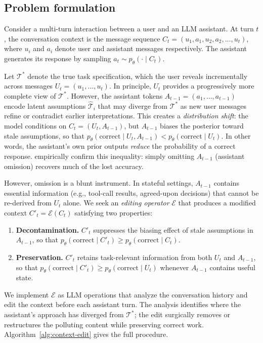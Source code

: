 \documentclass{article}
\begin{document}
\subsection{Problem formulation}
\label{sec:problem-setting}

Consider a multi-turn interaction between a user and an LLM assistant. At turn $t$, the conversation context is the message sequence $C_t = (u_1, a_1, u_2, a_2, \ldots, u_t)$, where $u_i$ and $a_i$ denote user and assistant messages respectively. The assistant generates its response by sampling $a_t \sim p_\theta(\cdot \mid C_t)$.

Let $\mathcal{T}^*$ denote the true task specification, which the user reveals incrementally across messages $U_t = (u_1, \ldots, u_t)$.  In principle, $U_t$ provides a progressively more complete view of $\mathcal{T}^*$.  However, the assistant tokens $A_{t-1} = (a_1, \ldots, a_{t-1})$ encode latent assumptions $\hat{\mathcal{T}}_i$ that may diverge from $\mathcal{T}^*$ as new user messages refine or contradict earlier interpretations.  This creates a \emph{distribution shift}: the model conditions on $C_t = (U_t, A_{t-1})$, but $A_{t-1}$ biases the posterior toward stale assumptions, so that $p_\theta(\text{correct} \mid U_t, A_{t-1}) < p_\theta(\text{correct} \mid U_t)$. In other words, the assistant's own prior outputs \emph{reduce} the probability of a correct response. \citet{huang2026context} empirically confirm this inequality: simply omitting $A_{t-1}$ (assistant omission) recovers much of the lost accuracy.

However, omission is a blunt instrument. In stateful settings, $A_{t-1}$ contains essential information (e.g., tool-call results, agreed-upon decisions) that cannot be re-derived from $U_t$ alone. We seek an \emph{editing operator} $\mathcal{E}$ that produces a modified context $C'_t = \mathcal{E}(C_t)$ satisfying two properties:
\begin{enumerate}
    \item \textbf{Decontamination.} $C'_t$ suppresses the biasing effect of stale assumptions in $A_{t-1}$, so that $p_\theta(\text{correct} \mid C'_t) \geq p_\theta(\text{correct} \mid C_t)$.
    \item \textbf{Preservation.} $C'_t$ retains task-relevant information from both $U_t$ and $A_{t-1}$, so that $p_\theta(\text{correct} \mid C'_t) \geq p_\theta(\text{correct} \mid U_t)$ whenever $A_{t-1}$ contains useful state.
\end{enumerate}

We implement $\mathcal{E}$ as LLM operations that analyze the conversation history and edit the context before each assistant turn. The analysis identifies where the assistant's approach has diverged from $\mathcal{T}^*$; the edit surgically removes or restructures the polluting content while preserving correct work. Algorithm~\ref{alg:context-edit} gives the full procedure.
\end{document}
